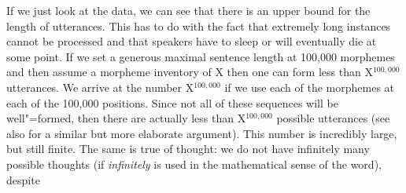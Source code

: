 \noindent
If we just look at the data, we can see that there is an upper bound for the length of utterances. This has to do with the fact that
extremely long instances cannot be processed and that speakers have to sleep or will eventually die at some point.
If we set a generous maximal sentence length at 100,000 morphemes and then assume a morpheme inventory of X then one can form less than
X$^{100,000}$ utterances. We arrive at the number X$^{100,000}$ if we use each of the morphemes at each of the 100,000 positions.
Since not all of these sequences will be well"=formed, then there are actually less than
X$^{100,000}$ possible utterances (see also \citealp{Weydt72a} for a similar but more elaborate argument). This number
is incredibly large, but still finite. The same is true of thought: we do not have infinitely many
possible thoughts (if \emph{infinitely} is used in the mathematical sense of the word), despite
